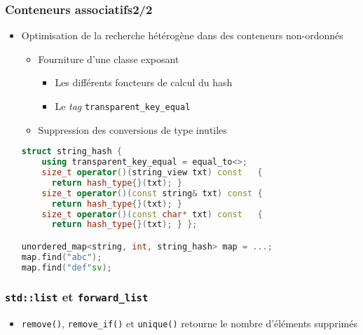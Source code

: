 \documentclass[C++.tex]{subfiles}
\begin{document}
\begin{frame}[fragile]
	\frametitle{Conteneurs associatifs\titlehfill{}2/2}
	\begin{itemize}
		\item Optimisation de la recherche hétérogène dans des conteneurs non-ordonnés
		\begin{itemize}
			\item Fourniture d'une classe exposant
			\begin{itemize}
				\item Les différents foncteurs de calcul du hash
				\item Le \textit{tag} \lstinline|transparent_key_equal|
			\end{itemize}
			\item Suppression des conversions de type inutiles
		\end{itemize}

		\begin{lstlisting}[language=C++]
struct string_hash {
	using transparent_key_equal = equal_to<>;
	size_t operator()(string_view txt) const   { 
	  return hash_type{}(txt); }
	size_t operator()(const string& txt) const {
	  return hash_type{}(txt); }
	size_t operator()(const char* txt) const   {
	  return hash_type{}(txt); } };

unordered_map<string, int, string_hash> map = ...;
map.find("abc");
map.find("def"sv);\end{lstlisting}
	\end{itemize}
\end{frame}

\begin{frame}[fragile]
	\frametitle{\lstinline|std::list| et \lstinline|forward_list|}
	\begin{itemize}
		\item \lstinline|remove()|, \lstinline|remove_if()| et \lstinline|unique()| retourne le nombre d'éléments supprimés
	\end{itemize}
\end{frame}
\end{document}
